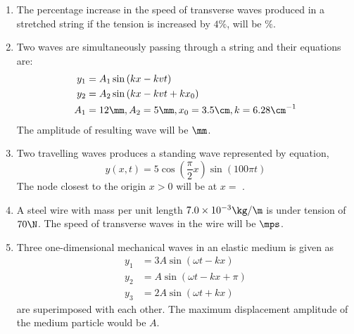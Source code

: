 \documentclass{article}
\begin{document}
\begin{enumerate}
\item The percentage increase in the speed of transverse waves produced in a stretched string if the tension is \linebreak increased by $4\%$, will be \hrulefill $\%$.  

\item Two waves are simultaneously passing through a string and their equations are:
	\begin{align*}
		y_1 &= A_1\sin\left(kx -kvt\right) \\
		y_2 &= A_2\sin\left(kx -kvt + kx_0\right)\\
		A_1 &= 12\mm, A_2=5\mm, x_0=3.5\cm, k=6.28\cm^{-1}
	\end{align*}
	The amplitude of resulting wave will be \hrulefill $\mm$. 

\item Two travelling waves produces a standing wave represented by equation, \[ y(x, t) = 5\cos\left(\dfrac{\pi}{2}x\right)\sin\left(100\pi t\right)\] The node closest to the origin $x>0$ will be at $x=$ \hrulefill . 

\item A steel wire with mass per unit length $7.0\times 10^{-3}\kg/\m$ is under tension of $70\N$. The speed of transverse waves in the wire will be \hrulefill $\mps$. 
	
\item Three one-dimensional mechanical waves in an elastic medium is given as 
	\begin{align*}
		y_1 &= 3A\sin\left(\omega t - kx\right)\\
		y_2 &= A\sin\left(\omega t - kx + \pi\right)\\
		y_3 &= 2A\sin\left(\omega t + kx \right)
	\end{align*}
	are superimposed with each other. The maximum displacement amplitude of the medium particle would \linebreak be \hrulefill $A$. 

\end{enumerate}

\pagebreak


\end{document}
